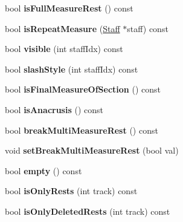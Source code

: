 \begin{DoxyCompactItemize}
\item 
\mbox{\label{class_ms_1_1_measure_ad2f9d925d748ce039a5ef8c336d0e8a5}} 
bool {\bfseries is\+Full\+Measure\+Rest} () const
\item 
\mbox{\label{class_ms_1_1_measure_a77bf53c43168bcf4531bc0d94b1cdf19}} 
bool {\bfseries is\+Repeat\+Measure} (\hyperlink{class_ms_1_1_staff}{Staff} $\ast$staff) const
\item 
\mbox{\label{class_ms_1_1_measure_ae951dd61fdd2d1210b615e75c8d8c0fd}} 
bool {\bfseries visible} (int staff\+Idx) const
\item 
\mbox{\label{class_ms_1_1_measure_adb305fa09a9a74495dc9e5a985edb75f}} 
bool {\bfseries slash\+Style} (int staff\+Idx) const
\item 
\mbox{\label{class_ms_1_1_measure_aaf2e3d06f88163f5bdfd0f68e11aa08e}} 
bool {\bfseries is\+Final\+Measure\+Of\+Section} () const
\item 
\mbox{\label{class_ms_1_1_measure_ad768f9ac1e7fe4d60174c5625e14fd25}} 
bool {\bfseries is\+Anacrusis} () const
\item 
\mbox{\label{class_ms_1_1_measure_adcb12997b0fc5b963013139a4e1f3921}} 
bool {\bfseries break\+Multi\+Measure\+Rest} () const
\item 
\mbox{\label{class_ms_1_1_measure_a2326df9111e16c302d1e637c6c8ea167}} 
void {\bfseries set\+Break\+Multi\+Measure\+Rest} (bool val)
\item 
\mbox{\label{class_ms_1_1_measure_a3e481c6a09a16b60cde88b1e672684c9}} 
bool {\bfseries empty} () const
\item 
\mbox{\label{class_ms_1_1_measure_a0bacadec09269f14e4b58149a7fbf175}} 
bool {\bfseries is\+Only\+Rests} (int track) const
\item 
\mbox{\label{class_ms_1_1_measure_ad6c117158b44ca9aeb05bc979e989436}} 
bool {\bfseries is\+Only\+Deleted\+Rests} (int track) const

\end{DoxyCompactItemize}
